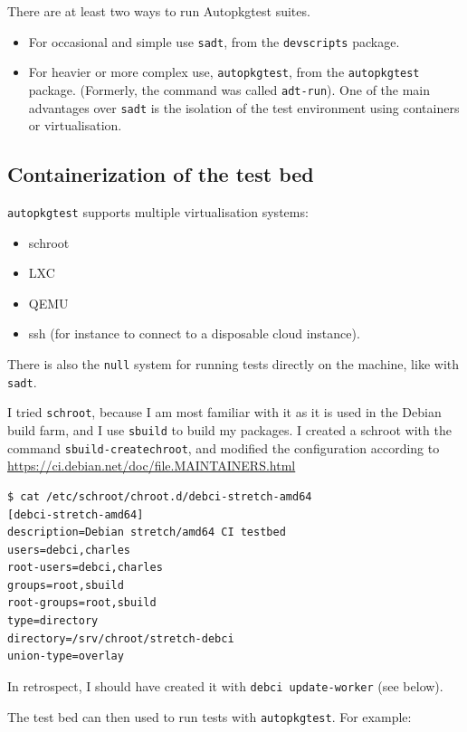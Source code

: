 \documentclass[mingoth,a4paper]{jsarticle}
\providecommand{\tightlist}{%
  \setlength{\itemsep}{0pt}\setlength{\parskip}{0pt}}
\begin{document}
There are at least two ways to run Autopkgtest suites.

\begin{itemize}
\item
  For occasional and simple use \texttt{sadt}, from the
  \texttt{devscripts} package.
\item
  For heavier or more complex use, \texttt{autopkgtest}, from the
  \texttt{autopkgtest} package. (Formerly, the command was called
  \texttt{adt-run}). One of the main advantages over \texttt{sadt} is
  the isolation of the test environment using containers or
  virtualisation.
\end{itemize}

\subsection{Containerization of the test
bed}\label{containerization-of-the-test-bed}

\texttt{autopkgtest} supports multiple virtualisation systems:

\begin{itemize}
\tightlist
\item
  schroot
\item
  LXC
\item
  QEMU
\item
  ssh (for instance to connect to a disposable cloud instance).
\end{itemize}

There is also the \texttt{null} system for running tests directly on the
machine, like with \texttt{sadt}.

I tried \texttt{schroot}, because I am most familiar with it as it is
used in the Debian build farm, and I use \texttt{sbuild} to build my
packages. I created a schroot with the command
\texttt{sbuild-createchroot}, and modified the configuration according
to \url{https://ci.debian.net/doc/file.MAINTAINERS.html}

\begin{verbatim}
$ cat /etc/schroot/chroot.d/debci-stretch-amd64 
[debci-stretch-amd64]
description=Debian stretch/amd64 CI testbed
users=debci,charles
root-users=debci,charles
groups=root,sbuild
root-groups=root,sbuild
type=directory
directory=/srv/chroot/stretch-debci
union-type=overlay
\end{verbatim}

In retrospect, I should have created it with
\texttt{debci\ update-worker} (see below).

The test bed can then used to run tests with \texttt{autopkgtest}. For
example:
\end{document}

